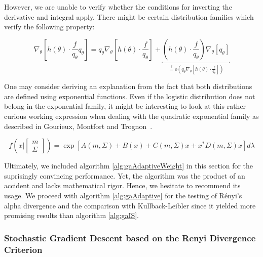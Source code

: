 However, we are unable to verify whether the conditions for inverting the derivative and integral apply. 
There might be certain distribution families which verify the following property:

$$\nabla_\theta\left[ h(\theta) \cdot \frac f {q_\theta} q_\theta \right] 
= 
q_\theta \nabla_\theta\left[ h(\theta) \cdot \frac f {q_\theta} \right] + \underbracket{\left(h(\theta) \cdot \frac f {q_\theta}\right) \nabla_\theta\left[ q_\theta \right]}_{\overset ? =  o \left(q_\theta \nabla_\theta\left[ h(\theta) \cdot \frac f {q_\theta} \right]\right)}
$$

One may consider deriving an explanation from the fact that both distributions are defined using exponential functions. Even if the logistic distribution does not belong in the exponential family, it might be interesting to look at this rather curious working expression when dealing with the quadratic exponential family as described in Gourieux, Montfort and Trognon~\cite{pmle}.

$$f(x \vert \begin{bmatrix}
    m \\ \Sigma
\end{bmatrix}) = \exp \left[ A(m, \Sigma) + B(x) + C(m, \Sigma)x + x^* D(m, \Sigma) x \right] d\lambda 
$$

Ultimately, we included algorithm \ref{alg:gaAdaptiveWeight} in this section for the suprisingly convincing performance. Yet, the algorithm was the product of an accident and lacks mathematical rigor. Hence, we hesitate to recommend its usage. We proceed with algorithm \ref{alg:gaAdaptive}  for the testing of Rényi's alpha divergence and the comparison with Kullback-Leibler since it yielded more promising results than algorithm \ref{alg:gaIS}.

\subsubsection{Stochastic Gradient Descent based on the Renyi Divergence Criterion}

